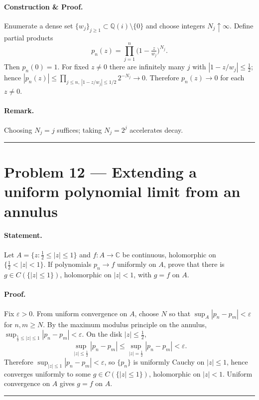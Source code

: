 \documentclass[12pt,a4paper]{article}
\theoremstyle{plain}
\theoremstyle{definition}
\theoremstyle{remark}
\theoremstyle{remark}
\begin{document}
\paragraph{Construction \& Proof.}
Enumerate a dense set $\{w_j\}_{j\ge1}\subset\mathbb Q(i)\setminus\{0\}$ and choose integers
$N_j\uparrow\infty$. Define partial products
\[
p_n(z)=\prod_{j=1}^{n}\big(1-\tfrac{z}{w_j}\big)^{N_j}.
\]
Then $p_n(0)=1$. For fixed $z\ne0$ there are infinitely many $j$ with
$|1-z/w_j|\le\frac12$; hence $|p_n(z)|\le\prod_{j\le n,\ |1-z/w_j|\le1/2}2^{-N_j}\to0$.
Therefore $p_n(z)\to0$ for each $z\ne0$.

\paragraph{Remark.}
Choosing $N_j=j$ suffices; taking $N_j=2^j$ accelerates decay.

\noindent\rule{\textwidth}{0.4pt}


\bigskip
\section*{Problem 12 — Extending a uniform polynomial limit from an annulus}

\paragraph{Statement.}
Let $A=\{z: \tfrac12\le|z|\le1\}$ and $f:A\to\mathbb C$ be continuous, holomorphic on
$\{ \tfrac12<|z|<1\}$. If polynomials $p_n\to f$ uniformly on $A$, prove that there is
$g\in C(\{|z|\le1\})$, holomorphic on $|z|<1$, with $g=f$ on $A$.

\paragraph{Proof.}
Fix $\varepsilon>0$. From uniform convergence on $A$, choose $N$ so that
$\sup_{A}|p_n-p_m|<\varepsilon$ for $n,m\ge N$. By the maximum modulus principle on the annulus,
$\sup_{\tfrac12\le|z|\le1}|p_n-p_m|<\varepsilon$. On the disk $|z|\le\tfrac12$,
\[
\sup_{|z|\le\tfrac12}|p_n-p_m|
\le \sup_{|z|=\tfrac12}|p_n-p_m|<\varepsilon.
\]
Therefore $\sup_{|z|\le1}|p_n-p_m|<\varepsilon$, so $\{p_n\}$ is uniformly Cauchy on $|z|\le1$,
hence converges uniformly to some $g\in C(\{|z|\le1\})$, holomorphic on $|z|<1$.
Uniform convergence on $A$ gives $g=f$ on $A$.
	
\noindent\rule{\textwidth}{0.4pt}	
	
\end{document}

